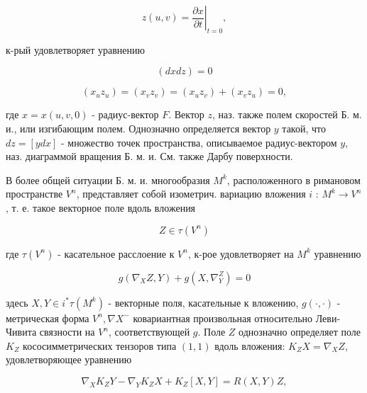 \documentclass[10pt]{article}
\begin{document}
\[

z(u, v)=\left.\frac{\partial x}{\partial t}\right|_{t=0},

\]



к-рый удовлетворяет уравнению



\[

(d x d z)=0

\]



\[

\left(x_{u} z_{u}\right)=\left(x_{v} z_{v}\right)=\left(x_{u} z_{v}\right)+\left(x_{v} z_{u}\right)=0,

\]



где $x=x(u, v, 0)$ - радиус-вектор $F$. Вектор $z$, наз. также полем скоростей Б. м. и., или изгибающим полем. Однозначно определяется вектор $y$ такой, что $d z=[y d x]$ - множество точек пространства, описываемое радиус-вектором $y$, наз. диаграммой вращения Б. м. и. См. также Дарбу поверхности.



В более общей ситуации Б. м. и. многообразия $M^{k}$, расположенного в римановом пространстве $V^{n}$, представляет собой изометрич. вариацию вложения $i$ : $M^{k} \rightarrow V^{n}$, т. е. такое векторное поле вдоль вложения



\[

Z \in \tau\left(V^{n}\right)

\]



где $\tau\left(V^{n}\right)$ - касательное расслоение к $V^{n}$, к-рое удовлетворяет на $M^{k}$ уравнению



\[

g\left(\nabla_{X} Z, Y\right)+g\left(X, \nabla_{Y}^{Z}\right)=0

\]



здесь $X, Y \in i^{*} \tau\left(M^{k}\right)$ - векторные поля, касательные к вложению, $g(\cdot, \cdot)$ - метрическая форма $V^{n}, \nabla X^{-}$ ковариантная произвольная относительно Леви-Чивита связности на $V^{n}$, соответствующей $g$. Поле $Z$ однозначно определяет поле $K_{Z}$ кососимметрических тензоров типа $(1,1)$ вдоль вложения: $K_{Z} X=\nabla{ }_{X} Z$, удовлетворяющее уравнению



\[

\nabla_{X} K_{Z} Y-\nabla_{Y} K_{Z} X+K_{Z}[X, Y]=R(X, Y) Z,

\]
\end{document}
